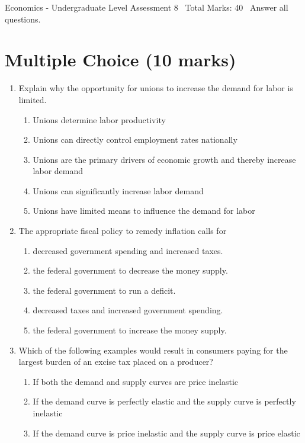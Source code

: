 \documentclass[12pt]{article}
\begin{document}
\begin{center}
Economics - Undergraduate Level Assessment 8 \
Total Marks: 40 \
Answer all questions.
\end{center}

\section*{Multiple Choice (10 marks)}
\begin{enumerate}[label=\arabic*.]
\item Explain why the opportunity for unions to increase the demand for labor is limited.
\begin{enumerate}[label=(\alph*)]
    \item Unions determine labor productivity
    \item Unions can directly control employment rates nationally
    \item Unions are the primary drivers of economic growth and thereby increase labor demand
    \item Unions can significantly increase labor demand
    \item Unions have limited means to influence the demand for labor
\end{enumerate}
\item The appropriate fiscal policy to remedy inflation calls for
\begin{enumerate}[label=(\alph*)]
    \item decreased government spending and increased taxes.
    \item the federal government to decrease the money supply.
    \item the federal government to run a deficit.
    \item decreased taxes and increased government spending.
    \item the federal government to increase the money supply.
\end{enumerate}
\item Which of the following examples would result in consumers paying for the largest burden of an excise tax placed on a producer?
\begin{enumerate}[label=(\alph*)]
    \item If both the demand and supply curves are price inelastic
    \item If the demand curve is perfectly elastic and the supply curve is perfectly inelastic
    \item If the demand curve is price inelastic and the supply curve is price elastic

\end{enumerate}
\end{enumerate}
\end{document}
